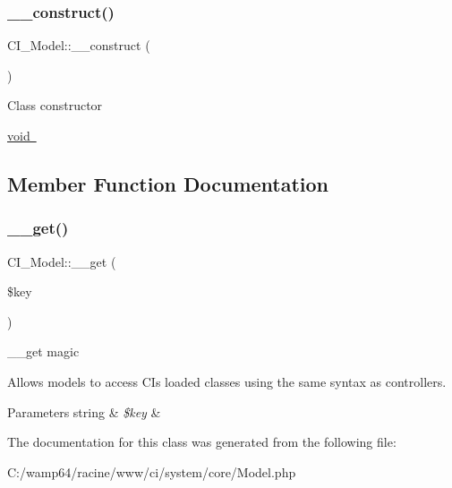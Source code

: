 \subsubsection{\texorpdfstring{\+\_\+\+\_\+construct()}{\_\_construct()}}
{\footnotesize\ttfamily C\+I\+\_\+\+Model\+::\+\_\+\+\_\+construct (\begin{DoxyParamCaption}{ }\end{DoxyParamCaption})}

Class constructor

\mbox{\hyperlink{}{void }}

\subsection{Member Function Documentation}
\mbox{\label{class_c_i___model_a97e04f7e5b0c093f66f0bc783acd077b}} 
\subsubsection{\texorpdfstring{\+\_\+\+\_\+get()}{\_\_get()}}
{\footnotesize\ttfamily C\+I\+\_\+\+Model\+::\+\_\+\+\_\+get (\begin{DoxyParamCaption}\item[{}]{\$key }\end{DoxyParamCaption})}

\+\_\+\+\_\+get magic

Allows models to access CI\textquotesingle{}s loaded classes using the same syntax as controllers.


\begin{DoxyParams}[1]{Parameters}
string & {\em \$key} & \\
\hline
\end{DoxyParams}


The documentation for this class was generated from the following file\+:\begin{DoxyCompactItemize}
\item 
C\+:/wamp64/racine/www/ci/system/core/Model.\+php\end{DoxyCompactItemize}

